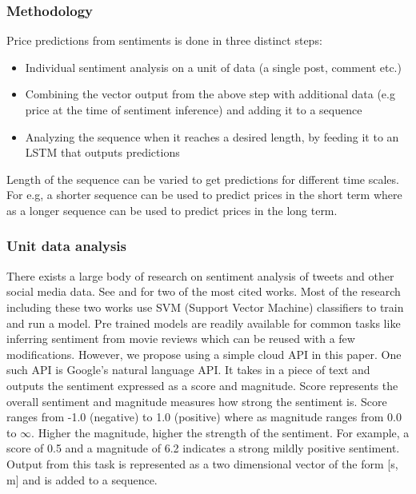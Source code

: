 \documentclass[a4paper]{article}
\begin{document}
\subsubsection{Methodology}
Price predictions from sentiments is done in three distinct steps:
\begin{itemize}
	\item Individual sentiment analysis on a unit of data (a single post, comment etc.)
	\item Combining the vector output from the above step with additional data (e.g price at the time of sentiment inference) and adding it to a sequence
	\item Analyzing the sequence when it reaches a desired length, by feeding it to an LSTM that outputs predictions
\end{itemize}
Length of the sequence can be varied to get predictions for different time scales. For e.g, a shorter sequence can be used to predict prices in the short term where as a longer sequence can be used to
predict prices in the long term.

\subsubsection{Unit data analysis}
There exists a large body of research on sentiment analysis of tweets and other social media data. See \cite{TweetAnalysis1} and \cite{TweetAnalysis2} for two of the most cited works. Most of the research including these two works use SVM (Support Vector Machine) classifiers to train and run a model. Pre trained models are readily available for common tasks like inferring sentiment from movie reviews which can be reused with a few modifications. However, we propose using a simple cloud API in this paper. One such API is Google's natural language API. It takes in a piece of text and outputs the sentiment expressed as a score and magnitude. Score represents the overall sentiment and magnitude measures how strong the sentiment is. Score ranges from -1.0 (negative) to 1.0 (positive) where as magnitude ranges from 0.0 to $\infty$. Higher the magnitude, higher the strength of the sentiment. For example, a score of 0.5 and a magnitude of 6.2 indicates a strong mildly positive sentiment. Output from this task is represented as a two dimensional vector of the form [s, m] and is added to a sequence.
\end{document}
